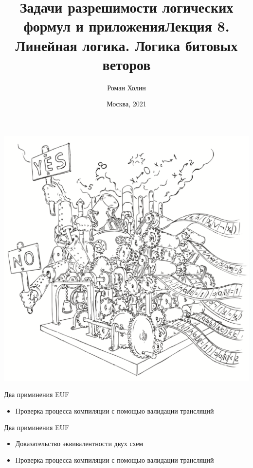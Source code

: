 \documentclass{beamer}
\begin{document}
\title{Задачи разрешимости логических формул и приложения\newline Лекция 8. Линейная логика. Логика битовых веторов}
\author{Роман Холин}
\date{Москва, 2021}

\begin{frame}
\includegraphics[scale=0.5]{../decision-procedure.png}
\end{frame}

\frame{\titlepage}

\begin{frame}{Два приминения EUF}
\begin{itemize}
\item Проверка процесса компиляции с помощью валидации трансляций
\end{itemize}
\end{frame}

\begin{frame}{Два приминения EUF}
\begin{itemize}
\item Доказательство эквивалентности двух схем
\item Проверка процесса компиляции с помощью валидации трансляций
\end{itemize}
\end{frame}
\end{document}
